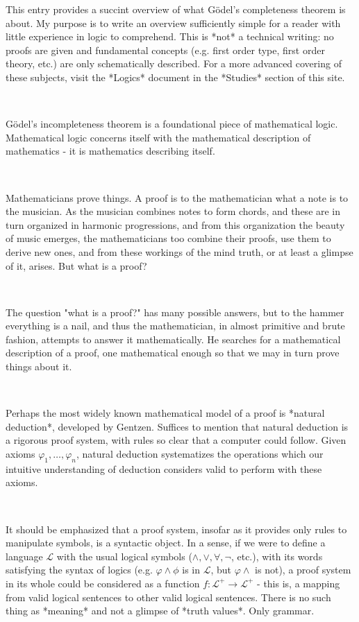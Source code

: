 \documentclass[a4paper, 12pt]{article}
\begin{document}
    
This entry provides a succint overview of what Gödel's completeness theorem is
about. My purpose is to write an overview sufficiently simple for a reader with
little experience in logic to comprehend. This is *not* a technical writing:
no proofs are given and fundamental concepts (e.g. first order type, first order
theory, etc.) are only schematically described. For a more advanced covering of
these subjects, visit the *Logics* document in the *Studies* section of this
site.

~

Gödel's incompleteness theorem is a foundational piece of mathematical logic.
Mathematical logic concerns itself with the mathematical description of
mathematics - it is mathematics describing itself. 

~

Mathematicians prove things. A proof is to the mathematician what a
note is to the musician. As the musician combines notes to form chords, and these
are in turn organized in harmonic progressions, and from this organization the
beauty of music emerges, the mathematicians too combine their proofs, use them
to derive new ones, and from these workings of the mind truth, or at least a
glimpse of it, arises. But what is a proof?

~

The question "what is a proof?" has many possible answers, but to the hammer
everything is a nail, and thus the mathematician, in almost
primitive and brute fashion, attempts to answer it mathematically. He searches
for a mathematical description of a proof, one mathematical enough so that we
may in turn prove things about it.

~

Perhaps the most widely known mathematical model of a proof is *natural
deduction*, developed by
Gentzen. Suffices to
mention that natural deduction is a rigorous proof system, with rules so clear
that a computer could follow. Given axioms $\varphi_1, \ldots, \varphi_n$, natural 
deduction systematizes the operations which our intuitive understanding of deduction 
considers valid to perform with these axioms.

~

It should be emphasized that a proof system, insofar as it provides only
rules to manipulate symbols, is a syntactic object. In a sense, if we were to 
define a language $\mathcal{L}$ with the usual logical symbols ($\land, \lor,
\forall, \neg$, etc.), with its words satisfying the syntax of logics (e.g. 
$\varphi \land \phi$ is in $\mathcal{L}$, but $\varphi \land$ is not),
a proof system in its whole could be considered as a function $f : \mathcal{L}^+ \to \mathcal{L}^+$ - 
this is, a mapping from valid logical sentences to other valid logical
sentences. There is no such thing as *meaning* and not a glimpse of *truth values*.
Only grammar.
\end{document}
